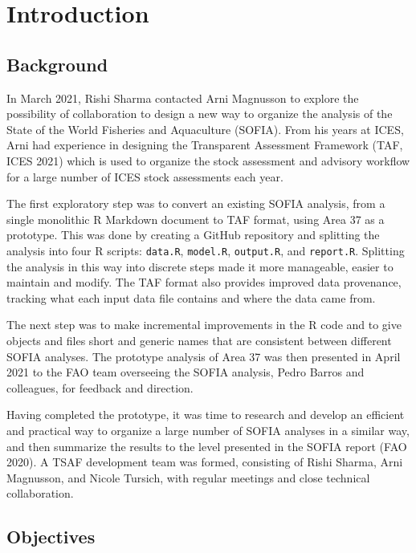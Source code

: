 \documentclass[12pt]{article}
\begin{document}

\section{Introduction}

\subsection{Background}

In March 2021, Rishi Sharma contacted Arni Magnusson to explore the possibility
of collaboration to design a new way to organize the analysis of the State of
the World Fisheries and Aquaculture (SOFIA). From his years at ICES, Arni had
experience in designing the Transparent Assessment Framework (TAF, ICES 2021)
which is used to organize the stock assessment and advisory workflow for a large
number of ICES stock assessments each year.

The first exploratory step was to convert an existing SOFIA analysis, from a
single monolithic R Markdown document to TAF format, using Area 37 as a
prototype. This was done by creating a GitHub repository and splitting the
analysis into four R scripts: \verb|data.R|, \verb|model.R|, \verb|output.R|,
and \verb|report.R|. Splitting the analysis in this way into discrete steps made
it more manageable, easier to maintain and modify. The TAF format also provides
improved data provenance, tracking what each input data file contains and where
the data came from.

The next step was to make incremental improvements in the R code and to give
objects and files short and generic names that are consistent between different
SOFIA analyses. The prototype analysis of Area 37 was then presented in April
2021 to the FAO team overseeing the SOFIA analysis, Pedro Barros and colleagues,
for feedback and direction.

Having completed the prototype, it was time to research and develop an efficient
and practical way to organize a large number of SOFIA analyses in a similar way,
and then summarize the results to the level presented in the SOFIA report (FAO
2020). A TSAF development team was formed, consisting of Rishi Sharma, Arni
Magnusson, and Nicole Tursich, with regular meetings and close technical
collaboration.

\subsection{Objectives}
\end{document}
